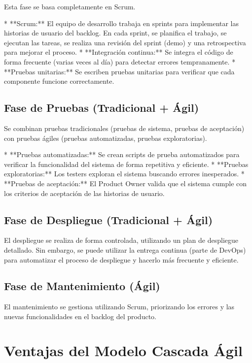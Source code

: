 \documentclass[12pt, spanish]{article}
\begin{document}
Esta fase se basa completamente en Scrum.

*   **Scrum:** El equipo de desarrollo trabaja en sprints para implementar las historias de usuario del backlog.  En cada sprint, se planifica el trabajo, se ejecutan las tareas, se realiza una revisión del sprint (demo) y una retrospectiva para mejorar el proceso.
*   **Integración continua:**  Se integra el código de forma frecuente (varias veces al día) para detectar errores tempranamente.
*   **Pruebas unitarias:** Se escriben pruebas unitarias para verificar que cada componente funcione correctamente.

\subsection*{Fase de Pruebas (Tradicional + Ágil)}

Se combinan pruebas tradicionales (pruebas de sistema, pruebas de aceptación) con pruebas ágiles (pruebas automatizadas, pruebas exploratorias).

*   **Pruebas automatizadas:**  Se crean scripts de prueba automatizados para verificar la funcionalidad del sistema de forma repetitiva y eficiente.
*   **Pruebas exploratorias:**  Los testers exploran el sistema buscando errores inesperados.
*   **Pruebas de aceptación:** El Product Owner valida que el sistema cumple con los criterios de aceptación de las historias de usuario.

\subsection*{Fase de Despliegue (Tradicional + Ágil)}

El despliegue se realiza de forma controlada, utilizando un plan de despliegue detallado.  Sin embargo, se puede utilizar la entrega continua (parte de DevOps) para automatizar el proceso de despliegue y hacerlo más frecuente y eficiente.

\subsection*{Fase de Mantenimiento (Ágil)}

El mantenimiento se gestiona utilizando Scrum, priorizando los errores y las nuevas funcionalidades en el backlog del producto.

\section*{Ventajas del Modelo Cascada Ágil}
\end{document}
